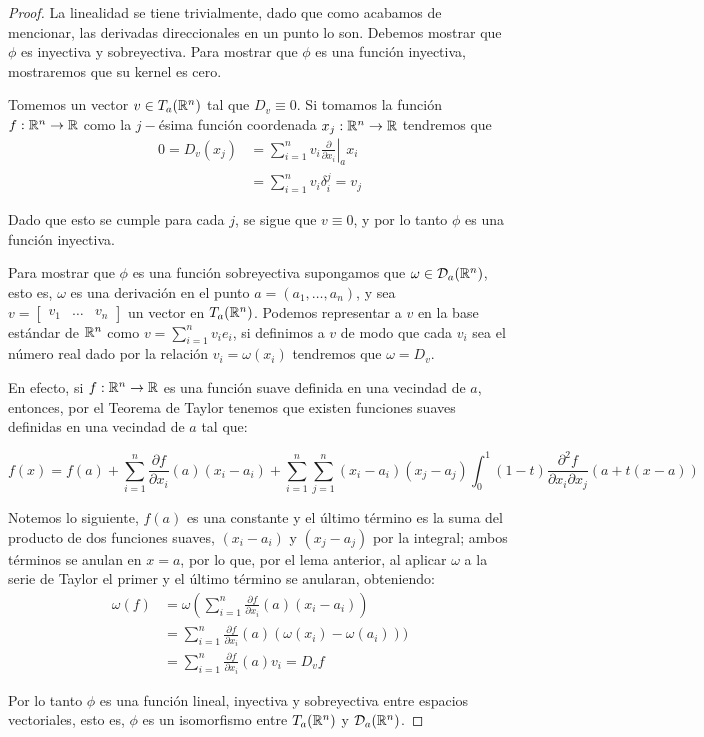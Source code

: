 \begin{proof}
	La linealidad se tiene trivialmente, dado que como acabamos de mencionar, las derivadas direccionales en un punto lo son. Debemos mostrar que $\phi$ es inyectiva y sobreyectiva. Para mostrar que $\phi$ es una función inyectiva, mostraremos que su kernel es cero.

	Tomemos un vector $v \in T_a(\mathbb{R}^n)$ tal que $D_v \equiv 0$. Si tomamos la función $f: \mathbb{R}^n \to \mathbb{R}$ como la $j-$ésima función coordenada $x_j: \mathbb{R}^n \to \mathbb{R}$ tendremos que
	\begin{align*}
		0 = D_v(x_j) & = \left. \sum_{i=1}^{n} v_i \frac{\partial}{\partial x_i} \right|_{a} x_i \\
		             & = \sum_{i=1}^{n} v_i \delta_i^j = v_j
	\end{align*}

	Dado que esto se cumple para cada $j$, se sigue que $v \equiv 0$, y por lo tanto $\phi$ es una función inyectiva.

	Para mostrar que $\phi$ es una función sobreyectiva supongamos que $\omega \in \mathcal{D}_a(\mathbb{R}^n)$, esto es, $\omega$ es una derivación en el punto $a = (a_1, \dots, a_n)$, y sea $v = \begin{bmatrix} v_1 & \dots & v_n \end{bmatrix}$ un vector en $T_a(\mathbb{R}^n)$. Podemos representar a $v$ en la base estándar de $\mathbb{R}^n$ como $v = \sum_{i=1}^{n} v_i e_i$, si definimos a $v$ de modo que cada $v_i$ sea el número real dado por la relación $v_i = \omega(x_i)$ tendremos que $\omega = D_v$.

	En efecto, si $f: \mathbb{R}^n \to \mathbb{R}$ es una función suave definida en una vecindad de $a$, entonces, por el Teorema de Taylor tenemos que existen funciones suaves definidas en una vecindad de $a$ tal que:

	\[
		f(x) = f(a) + \sum_{i=1}^{n} \frac{\partial f}{\partial x_i} (a) (x_i - a_i) + \sum_{i=1}^{n} \sum_{j=1}^{n} (x_i - a_i)(x_j - a_j) \int_{0}^{1} (1-t) \frac{\partial^2 f}{\partial x_i \partial x_j} (a + t(x - a))
	\]

	Notemos lo siguiente, $f(a)$ es una constante y el último término es la suma del producto de dos funciones suaves, $(x_i - a_i)$ y $(x_j - a_j)$ por la integral; ambos términos se anulan en $x = a$, por lo que, por el lema anterior, al aplicar $\omega$ a la serie de Taylor el primer y el último término se anularan, obteniendo:
	\begin{align*}
		\omega(f) & = \omega(\sum_{i=1}^{n} \frac{\partial f}{\partial x_i} (a )(x_i - a_i))         \\
		          & = \sum_{i=1}^{n} \frac{\partial f}{\partial x_i} (a)(\omega(x_i) - \omega(a_i))) \\
		          & = \sum_{i=1}^{n} \frac{\partial f}{\partial x_i}(a) v_i = D_v f
	\end{align*}

	Por lo tanto $\phi$ es una función lineal, inyectiva y sobreyectiva entre espacios vectoriales, esto es, $\phi$ es un isomorfismo entre $T_a(\mathbb{R}^n)$ y $\mathcal{D}_a(\mathbb{R}^n)$.
\end{proof}

